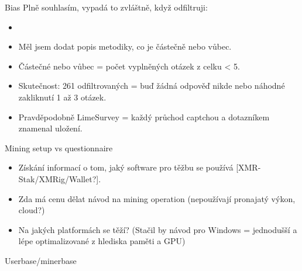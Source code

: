 \documentclass{beamer}
\begin{document}
\begin{darkframes}
\begin{frame}{Bias}
Plně souhlasím, vypadá to zvláštně, když odfiltruji:\begin{itemize}\itemsep0em
\item {} 
\item Měl jsem dodat popis metodiky, co je částečně nebo vůbec.
\end{itemize}
\vspace{0.5em}
\begin{itemize}\itemsep0em
\item Částečné nebo vůbec = počet vyplněných otázek z celku < 5. 
\item Skutečnost: 261 odfiltrovaných = buď žádná odpověď nikde nebo náhodné zakliknutí 1 až 3 otázek.
\item Pravděpodobně  LimeSurvey = každý průchod captchou a dotazníkem znamenal uložení.
\end{itemize}
    \end{frame}
        \begin{frame}{Mining setup vs questionnaire}
     \color{aquamarine}
\vspace{1em}
\begin{itemize}
\item Získání informací o tom, jaký software pro těžbu se používá [XMR-Stak/XMRig/Wallet?].
\item Zda má cenu dělat návod na mining operation (nepoužívají pronajatý výkon, cloud?)
\item Na jakých platformách se těží? (Stačil by návod pro Windows = jednodušší a lépe optimalizované z hlediska paměti a GPU)
\end{itemize}

    \end{frame}

        \begin{frame}{Userbase/minerbase}
     \color{aquamarine}
    \end{frame}
    

\end{darkframes}
\end{document}

